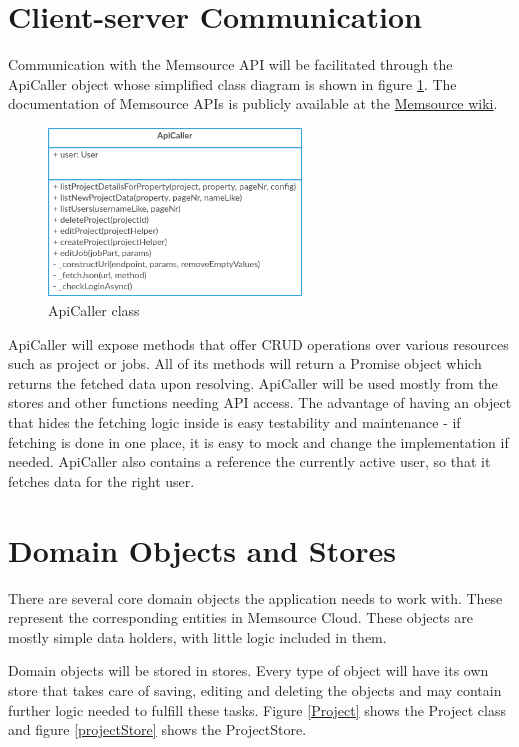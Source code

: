 \section{Client-server Communication}

Communication with the Memsource API will be facilitated through the ApiCaller object whose simplified class diagram is shown in figure \ref{ApiCaller}. The documentation of Memsource APIs is publicly available at the \href{http://wiki.memsource.com/wiki/Memsource_API#API_Reference}{Memsource wiki}.

\begin{figure}[H]
	\includegraphics[width=0.6\textwidth]{pics/ApiCaller}
	\caption{ApiCaller class}
	\label{ApiCaller}
\end{figure}


ApiCaller will expose methods that offer CRUD operations over various resources such as project or jobs. All of its methods will return a Promise object which returns the fetched data upon resolving. ApiCaller will be used mostly from the stores and other functions needing API access. The advantage of having an object that hides the fetching logic inside is easy testability and maintenance - if fetching is done in one place, it is easy to mock and change the implementation if needed. ApiCaller also contains a reference the currently active user, so that it fetches data for the right user.


\section{Domain Objects and Stores}\label{sec:stores}

There are several core domain objects the application needs to work with. These represent the corresponding entities in Memsource Cloud. These objects are mostly simple data holders, with little logic included in them. 

Domain objects will be stored in stores. Every type of object will have its own store that takes care of saving, editing and deleting the objects and may contain further logic needed to fulfill these tasks.
Figure \ref{Project} shows the Project class and figure \ref{projectStore} shows the ProjectStore. 


